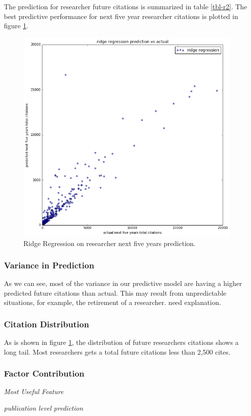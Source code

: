 

The prediction for researcher future citations is summarized in table \ref{tbl-r2}.
The best predictive performance for next five year researcher citations is plotted in figure \ref{researcher-prediction}.


\begin{figure}
\includegraphics[width=3 in]{fig/researcher-prediction.png}
\caption{Ridge Regression on researcher next five years prediction.}
\label{researcher-prediction}
\end{figure}




\subsubsection{Variance in Prediction}
As we can see, most of the variance in our predictive model are having a higher predicted future citations than actual. This may result from unpredictable situations, for example, the retirement of a researcher. {\sc need explanation.}
\subsubsection{Citation Distribution}
As is shown in figure \ref{researcher-prediction}, the distribution of future researchers citations shows a long tail. 
Most researchers gets a total future citations less than 2,500 cites.

\subsubsection{Factor Contribution}
{\it Most Useful Feature}

{\it publication level prediction}

































